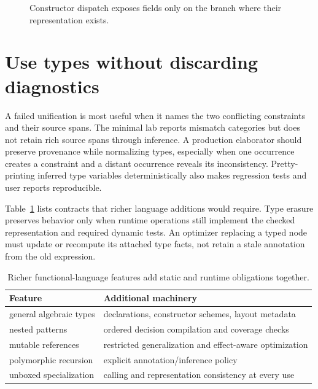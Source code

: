 \begin{figure}[htbp]
\centering
{}
\caption{Constructor dispatch exposes fields only on the branch where their representation exists.}
\label{fig:ch90-case}
\end{figure}

\section{Use types without discarding diagnostics}
\label{sec:ch90-diagnostics}
A failed unification is most useful when it names the two conflicting constraints and their source spans.
The minimal lab reports mismatch categories but does not retain rich source spans through inference.
A production elaborator should preserve provenance while normalizing types, especially when one occurrence creates a constraint and a distant occurrence reveals its inconsistency.
Pretty-printing inferred type variables deterministically also makes regression tests and user reports reproducible.

Table~\ref{tab:ch90-pattern-obligations} lists contracts that richer language additions would require.
Type erasure preserves behavior only when runtime operations still implement the checked representation and required dynamic tests.
An optimizer replacing a typed node must update or recompute its attached type facts, not retain a stale annotation from the old expression.

\begin{table}[htbp]
\caption{Richer functional-language features add static and runtime obligations together.}
\label{tab:ch90-pattern-obligations}
\centering
\begin{tabular}{ll}
\toprule
Feature & Additional machinery \\
\midrule
general algebraic types & declarations, constructor schemes, layout metadata \\
nested patterns & ordered decision compilation and coverage checks \\
mutable references & restricted generalization and effect-aware optimization \\
polymorphic recursion & explicit annotation/inference policy \\
unboxed specialization & calling and representation consistency at every use \\
\bottomrule
\end{tabular}
\end{table}

